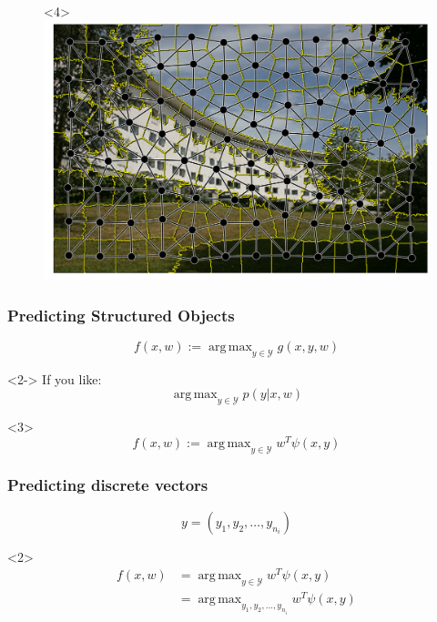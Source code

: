 \documentclass[final,ignorenonframetext,compress]{beamer}
\DeclareMathOperator*{\argmax}{arg\,max}
\begin{document}
\begin{frame}
\begin{figure}
        \begin{onlyenv}<4>
            \includegraphics[width=.6\linewidth]{images/scene_sp_graph}%
        \end{onlyenv}%
    \end{figure}
\end{frame}

\begin{frame}
    \frametitle{Predicting Structured Objects}
    \[f(x, w) := \argmax_{y \in \mathcal{Y}}  g(x, y, w) \]
    \begin{visibleenv}<2->
    If you like:
    \[\argmax_{y \in \mathcal{Y}}  p(y|x, w) \]
    \end{visibleenv}
    
    \begin{visibleenv}<3>
    \[f(x, w) := \argmax_{y \in \mathcal{Y}}  w^T \psi(x, y) \]
    \end{visibleenv}
\end{frame}

\begin{frame}
    \frametitle{Predicting discrete vectors}
    \[y = (y_1, y_2, \dotsc, y_{n_i})\]
    \begin{visibleenv}<2>
        \begin{align*}
        f(x, w) &= \argmax_{y \in \mathcal{Y}}  w^T \psi(x, y)\\
            &= \argmax_{y_1, y_2, \dotsc, y_{n_i}} w^T \psi(x, y)
        \end{align*}
    \end{visibleenv}
\end{frame}
\end{document}
